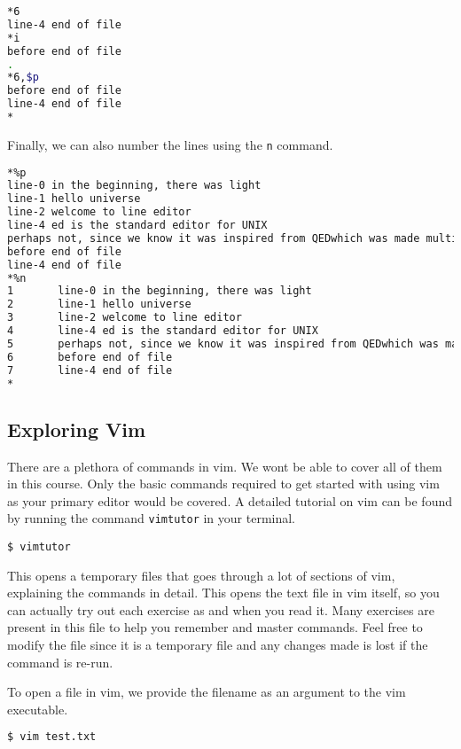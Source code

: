 \begin{lstlisting}[language=bash]
*6
line-4 end of file
*i
before end of file
.
*6,$p
before end of file
line-4 end of file
*
\end{lstlisting}

Finally, we can also number the lines using the \lstinline|n| command.

\begin{lstlisting}[language=bash]
*%p
line-0 in the beginning, there was light
line-1 hello universe
line-2 welcome to line editor
line-4 ed is the standard editor for UNIX
perhaps not, since we know it was inspired from QEDwhich was made multiple times by thompson and ritchiebefore ed was made.
before end of file
line-4 end of file
*%n
1       line-0 in the beginning, there was light
2       line-1 hello universe
3       line-2 welcome to line editor
4       line-4 ed is the standard editor for UNIX
5       perhaps not, since we know it was inspired from QEDwhich was made multiple times by thompson and ritchiebefore ed was made.
6       before end of file
7       line-4 end of file
*
\end{lstlisting}

\vfill
\pagebreak
\subsection{Exploring Vim}

There are a plethora of commands in vim.
We wont be able to cover all of them in this course.
Only the basic commands required to get started
with using vim as your primary editor would be
covered. A detailed tutorial on vim can be found
by running the command \lstinline|vimtutor| in your terminal.

\begin{lstlisting}
$ vimtutor
\end{lstlisting}

This opens a temporary files that goes through a lot of
sections of vim, explaining the commands in detail.
This opens the text file in vim itself, so you can
actually try out each exercise as and when you read it.
Many exercises are present in this file to help you
remember and master commands. Feel free to modify the
file since it is a temporary file and any changes made
is lost if the command is re-run.

To open a file in vim, we provide the filename as an argument
to the vim executable.

\begin{lstlisting}[language=bash]
$ vim test.txt
\end{lstlisting}


